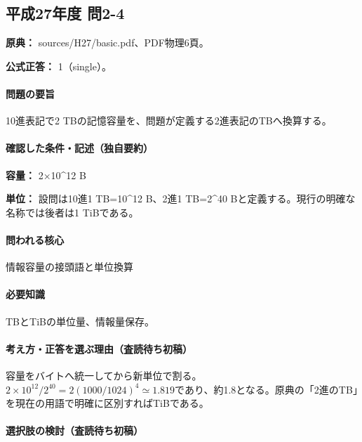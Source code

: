 \subsection{平成27年度 問2-4}
\label{q:h27-reg-basic-2-4}

\noindent\textbf{原典：} sources/H27/basic.pdf、PDF物理6頁。

\textbf{公式正答：} 1（single）。

\paragraph{問題の要旨} 10進表記で2 TBの記憶容量を、問題が定義する2進表記のTBへ換算する。

\paragraph{確認した条件・記述（独自要約）}\mbox{}\par

\noindent\textbf{容量：} 2×10\textasciicircum{}12 B\par

\noindent\textbf{単位：} 設問は10進1 TB=\allowbreak{}10\textasciicircum{}12 B、2進1 TB=\allowbreak{}2\textasciicircum{}40 Bと定義する。現行の明確な名称では後者は1 TiBである。\par

\paragraph{問われる核心} 情報容量の接頭語と単位換算

\paragraph{必要知識} TBとTiBの単位量、情報量保存。

\paragraph{考え方・正答を選ぶ理由（査読待ち初稿）} 容量をバイトへ統一してから新単位で割る。\(2\times10^{12}/2^{40}=2(1000/1024)^4\simeq1.819\)であり、約1.8となる。原典の「2進のTB」を現在の用語で明確に区別すればTiBである。

\paragraph{選択肢の検討（査読待ち初稿）}\mbox{}\par

